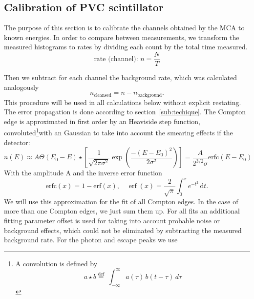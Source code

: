 \subsection{Calibration of PVC scintillator}
\label{sub:calibration}
The purpose of this section is to calibrate the channels obtained by the MCA to
known energies. In order to compare between measurements, we transform the measured 
histograms to rates by dividing each count by the total time measured. 
\begin{equation}
    \text{rate (channel): } n  = 	\frac{N}{T}
    \label{eq:rate}
\end{equation}

Then we subtract for each channel the background rate, which
was calculated analogously 
\begin{equation}
    n_\mathrm{cleansed} = n - n_\mathrm{background}.
    \label{eq:rate2}
\end{equation}
This procedure will be used in all calculations below without explicit restating. 
The error propagation is done according to section~\ref{sub:techique}.
The Compton edge is approximated in first order by an Heaviside step function,
convoluted\footnote{ 
    A convolution is defined by
\begin{equation}
    a \star b   \stackrel{\mathrm{def}}{=}\ \int_{-\infty}^\infty a(\tau)\, b(t - \tau)\, d\tau 	
    \label{eq:conv}
\end{equation}

}with an Gaussian to take into account the smearing
effects if the detector:
\begin{equation}
    n(E)  \approx A\Theta(E_0 - E) \star  	
    \left[  \frac{1}{\sqrt{2\pi\sigma^2}} \exp \left( 
        \frac{-(E-E_0)^2}{2\sigma^2}\right)
        \right]  =\frac{A}{2^{3/2}\sigma} 
    \mathrm{erfc}(E - E_0) 
    \label{eq:errorfunc}
\end{equation}
With the amplitude A and the inverse error function
\begin{equation}
    \mathrm{erfc}(x) = 1 - \mathrm{erf}(x) , \quad
    \operatorname{erf}(x) = 
    \frac{2}{\sqrt\pi}\int_0^x e^{-t^2}\,\mathrm dt. 
    \label{eq:erfc}
\end{equation}
We will use this approximation for the fit of all Compton 
edges. In the case of more than one Compton edges, we just
sum them up. For all fits an additional fitting parameter offset
is used for taking into account probable noise or background
effects, which could not be eliminated by subtracting the 
measured background rate. For the photon and escape peaks we use 
